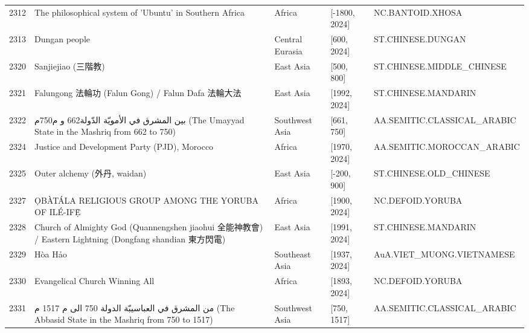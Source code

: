 {\begin{longtable}{rp{3.5cm}llp{3.5cm}}
2312 & {\raggedright The philosophical system of 'Ubuntu' in Southern Africa} & Africa & [-1800, 2024] & {\raggedright NC.\allowbreak{}BANTOID.\allowbreak{}XHOSA} \\
2313 & {\raggedright Dungan people} & Central Eurasia & [600, 2024] & {\raggedright ST.\allowbreak{}CHINESE.\allowbreak{}DUNGAN} \\
2320 & {\raggedright Sanjiejiao (三階教)} & East Asia & [500, 800] & {\raggedright ST.\allowbreak{}CHINESE.\allowbreak{}MIDDLE\_\allowbreak{}CHINESE} \\
2321 & {\raggedright Falungong 法輪功 (Falun Gong) / Falun Dafa 法輪大法} & East Asia & [1992, 2024] & {\raggedright ST.\allowbreak{}CHINESE.\allowbreak{}MANDARIN} \\
2322 & {\raggedright {\arabicfont بين  المشرق في الأمويّة الدّولة}662 {\arabicfont و م}750{\arabicfont م} (The Umayyad State in the Mashriq from 662 to 750)} & Southwest Asia & [661, 750] & {\raggedright AA.\allowbreak{}SEMITIC.\allowbreak{}CLASSICAL\_\allowbreak{}ARABIC} \\
2324 & {\raggedright Justice and Development Party (PJD), Morocco} & Africa & [1970, 2024] & {\raggedright AA.\allowbreak{}SEMITIC.\allowbreak{}MOROCCAN\_\allowbreak{}ARABIC} \\
2325 & {\raggedright Outer alchemy (外丹, waidan)} & East Asia & [-200, 900] & {\raggedright ST.\allowbreak{}CHINESE.\allowbreak{}OLD\_\allowbreak{}CHINESE} \\
2327 & {\raggedright ỌBÀTÁLA RELIGIOUS GROUP AMONG THE YORUBA OF ILÉ-IFẸ̀} & Africa & [1900, 2024] & {\raggedright NC.\allowbreak{}DEFOID.\allowbreak{}YORUBA} \\
2328 & {\raggedright Church of Almighty God (Quannengshen jiaohui 全能神教會) / Eastern Lightning (Dongfang shandian 東方閃電)} & East Asia & [1991, 2024] & {\raggedright ST.\allowbreak{}CHINESE.\allowbreak{}MANDARIN} \\
2329 & {\raggedright Hòa Hảo} & Southeast Asia & [1937, 2024] & {\raggedright AuA.\allowbreak{}VIET\_\allowbreak{}MUONG.\allowbreak{}VIETNAMESE} \\
2330 & {\raggedright Evangelical Church Winning All} & Africa & [1893, 2024] & {\raggedright NC.\allowbreak{}DEFOID.\allowbreak{}YORUBA} \\
2331 & {\raggedright {\arabicfont من  المشرق في العباسيبّة الدولة} 750 {\arabicfont الى م} 1517 {\arabicfont م} (The Abbasid State in the Mashriq from 750 to 1517)} & Southwest Asia & [750, 1517] & {\raggedright AA.\allowbreak{}SEMITIC.\allowbreak{}CLASSICAL\_\allowbreak{}ARABIC} \\

\end{longtable}}
